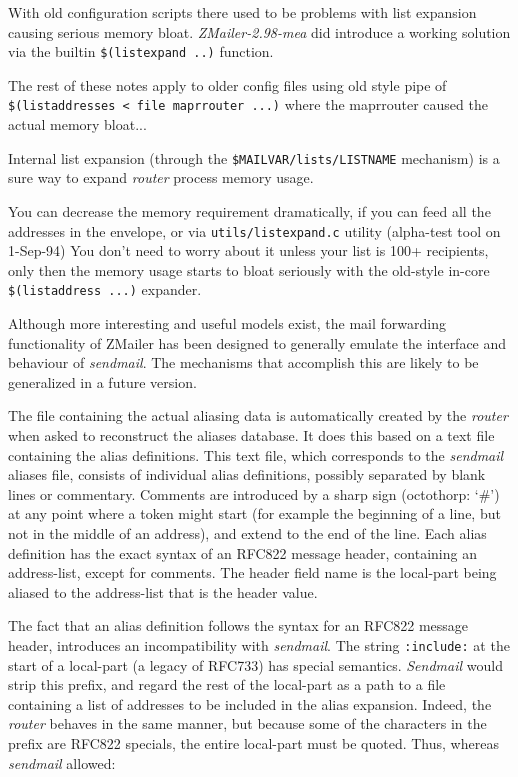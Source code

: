 With old configuration scripts there used to be problems with list
expansion causing serious memory bloat.  {\em ZMailer-2.98-mea\/} did introduce
a working solution via the builtin  {\tt \$(listexpand ..)} function.

The rest of these notes apply to older config files using old style pipe
of {\tt \$(listaddresses  < file {\verbar} maprrouter ...)}  where the  
maprrouter caused the actual memory bloat...

Internal list expansion (through the  {\tt \$MAILVAR/lists/LISTNAME} 
mechanism) is a sure way to expand {\em router\/} process memory usage.

You can decrease the memory requirement dramatically, if you can
feed all the addresses in the envelope, or via {\tt utils/listexpand.c}
utility (alpha-test tool on 1-Sep-94) You don't need to worry about 
it unless your list is 100+ recipients, only then the memory usage starts 
to bloat seriously with the old-style in-core {\tt \$(listaddress ...)} 
expander.

Although more interesting and useful models exist, the mail forwarding
functionality of ZMailer has been designed to generally emulate the
interface and behaviour of {\em sendmail\/}.  The mechanisms that accomplish this
are likely to be generalized in a future version.

The file containing the actual aliasing data is automatically created by
the {\em router\/} when asked to reconstruct the aliases database.  It does this
based on a text file containing the alias definitions.  This text file,
which corresponds to the {\em sendmail\/} aliases file, consists of individual
alias definitions, possibly separated by blank lines or commentary.
Comments are introduced by a sharp sign (octothorp: `\#') at any point where
a token might start (for example the beginning of a line, but not in the
middle of an address), and extend to the end of the line.  Each alias
definition has the exact syntax of an RFC822 message header, containing an
address-list, except for comments.  The header field name is the local-part
being aliased to the address-list that is the header value.

The fact that an alias definition follows the syntax for an RFC822 message
header, introduces an incompatibility with {\em sendmail\/}.  The string
{\tt :include:} at the start of a local-part (a legacy of RFC733) has special
semantics. {\em Sendmail\/} would strip this prefix, and regard the rest of the
local-part as a path to a file containing a list of addresses to be
included in the alias expansion. Indeed, the {\em router\/} behaves in the same
manner, but because some of the characters in the prefix are RFC822
specials, the entire local-part must be quoted.  Thus, whereas {\em sendmail\/}
allowed:

